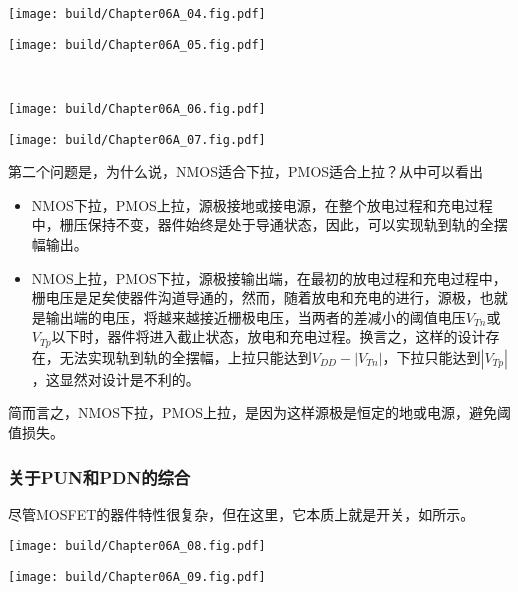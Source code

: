 \begin{Figure}[关于PUN和PDN的器件选择]
    \begin{FigureSub}[使用NMOS下拉]
        \texttt{[image: build/Chapter06A\_04.fig.pdf]}
    \end{FigureSub}\hspace{0.5cm}
    \begin{FigureSub}[使用PMOS下拉]
        \texttt{[image: build/Chapter06A\_05.fig.pdf]}
    \end{FigureSub}\\ \vspace{0.5cm}
    \begin{FigureSub}[使用NMOS上拉]
        \texttt{[image: build/Chapter06A\_06.fig.pdf]}
    \end{FigureSub}\hspace{0.5cm}
    \begin{FigureSub}[使用PMOS上拉]
        \texttt{[image: build/Chapter06A\_07.fig.pdf]}
    \end{FigureSub}
\end{Figure}
第二个问题是，为什么说，NMOS适合下拉，PMOS适合上拉？从中可以看出
\begin{itemize}
    \item NMOS下拉，PMOS上拉，源极接地或接电源，在整个放电过程和充电过程中，栅压保持不变，器件始终是处于导通状态，因此，可以实现轨到轨的全摆幅输出。
    \item NMOS上拉，PMOS下拉，源极接输出端，在最初的放电过程和充电过程中，栅电压是足矣使器件沟道导通的，然而，随着放电和充电的进行，源极，也就是输出端的电压，将越来越接近栅极电压，当两者的差减小的阈值电压$V_{Tn}$或$V_{Tp}$以下时，器件将进入截止状态，放电和充电过程。换言之，这样的设计存在，无法实现轨到轨的全摆幅，上拉只能达到$V_{DD}-|V_{Tn}|$，下拉只能达到$|V_{Tp}|$，这显然对设计是不利的。
\end{itemize}
简而言之，NMOS下拉，PMOS上拉，是因为这样源极是恒定的地或电源，避免阈值损失。

\subsubsection{关于PUN和PDN的综合}
尽管MOSFET的器件特性很复杂，但在这里，它本质上就是开关，如所示。

\begin{Figure}[开关的逻辑规则]
    \begin{FigureSub}[开关的串联]
        \texttt{[image: build/Chapter06A\_08.fig.pdf]}
    \end{FigureSub}\hspace{2cm}
    \begin{FigureSub}[开关的并联]
        \texttt{[image: build/Chapter06A\_09.fig.pdf]}
    \end{FigureSub}
\end{Figure}

